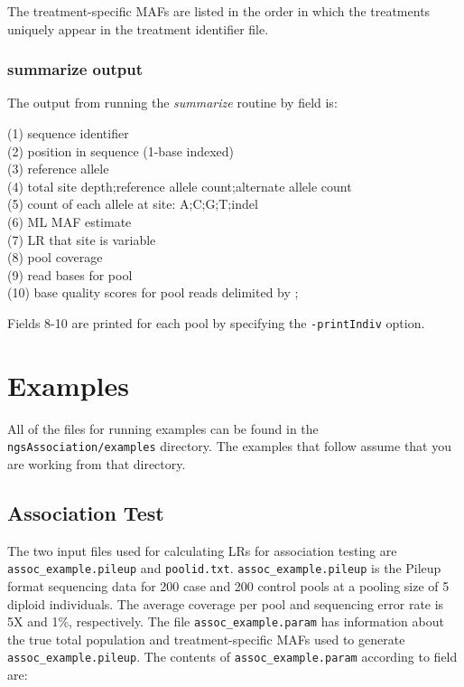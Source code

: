 \documentclass[12pt]{article}
\begin{document}
\vspace{5mm}

The treatment-specific MAFs are listed in the order in which the treatments uniquely appear in the treatment identifier file. 
\subsubsection{summarize output}

\label{sumout}

The output from running the \textit{summarize} routine by field is:

\vspace{5mm}

(1) sequence identifier\\
(2) position in sequence (1-base indexed)\\
(3) reference allele\\
(4) total site depth;reference allele count;alternate allele count\\
(5) count of each allele at site: A;C;G;T;indel\\
(6) ML MAF estimate\\
(7) LR that site is variable\\
(8) pool coverage\\
(9) read bases for pool\\
(10) base quality scores for pool reads delimited by ;

\vspace{5mm}

Fields 8-10 are printed for each pool by specifying the \texttt{-printIndiv} option.

\section{Examples}
All of the files for running examples can be found in the \texttt{ngsAssociation/examples} directory. The examples that follow assume that you are working from that directory.
\subsection{Association Test}

\label{assocex}

The two input files used for calculating LRs for association testing are \texttt{assoc\_example.pileup} and \texttt{poolid.txt}. \texttt{assoc\_example.pileup} is the Pileup format sequencing data for 200 case and 200 control pools at a pooling size of 5 diploid individuals. The average coverage per pool and sequencing error rate is 5X and 1\%, respectively. The file \texttt{assoc\_example.param} has information about the true total population and treatment-specific MAFs used to generate \texttt{assoc\_example.pileup}. The contents of \texttt{assoc\_example.param} according to field are:
\end{document}
